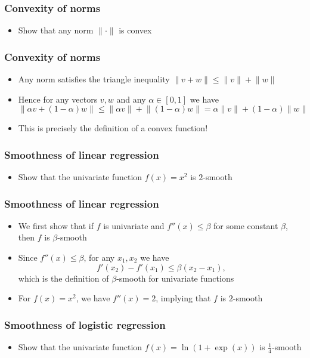 \documentclass[10pt]{beamer}
\begin{document}
\begin{frame}
  \frametitle{Convexity of norms}
  \begin{itemize}
	\item Show that any norm $\lVert \cdot \rVert$ is convex
  \end{itemize}
\end{frame}

\begin{frame}
  \frametitle{Convexity of norms}
  \begin{itemize}
	\item Any norm satisfies the {\color{red} triangle inequality} $\lVert v + w \rVert \leq \lVert v \rVert + \lVert w \rVert$
	\pause
	\item Hence for any vectors $v,w$ and any $\alpha\in[0,1]$ we have
	\[
	\lVert \alpha v + (1-\alpha) w \rVert \leq \lVert \alpha v \rVert + \lVert (1-\alpha) w \rVert = \alpha \lVert v \rVert + (1-\alpha)\lVert w \rVert
	\]
	\pause
	\item This is precisely the definition of a convex function!
  \end{itemize}
\end{frame}

\begin{frame}
  \frametitle{Smoothness of linear regression}
  \begin{itemize}
	\item Show that the univariate function $f(x) = x^2$ is $2$-smooth
  \end{itemize}
\end{frame}

\begin{frame}
  \frametitle{Smoothness of linear regression}
  \begin{itemize}
	\item We first show that if $f$ is univariate and $f''(x)\leq \beta$ for some constant $\beta$, then $f$ is $\beta$-smooth
	\pause
	\item Since $f''(x)\leq \beta$, for any $x_1,x_2$ we have
	\[f'(x_2) - f'(x_1) \leq \beta(x_2 - x_1),\]
	which is the definition of $\beta$-smooth for univariate functions
	\pause
	\vspace*{.5cm}
	\item For $f(x)=x^2$, we have $f''(x)=2$, implying that $f$ is $2$-smooth
  \end{itemize}
\end{frame}

\begin{frame}
  \frametitle{Smoothness of logistic regression}
  \begin{itemize}
	\item Show that the univariate function $f(x) = \ln(1+\exp(x))$ is $\frac 1 4$-smooth
  \end{itemize}
\end{frame}
\end{document}
